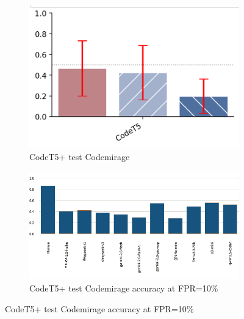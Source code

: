 \begin{figure}[H]
    \begin{subfigure}[b]{0.4\textwidth}
        \centering
        \includegraphics[width=\linewidth]{img/TEST/ohoh/CodeT5+/Codemirage.png}
        \caption{CodeT5+ test Codemirage}
        \label{fig:2}
    \end{subfigure}
    \hfill
    \begin{subfigure}[t]{0.4\textwidth}
        \centering
        \includegraphics[width=\linewidth]{img/TEST/ohoh/Codemirage2.png}
        \caption{CodeT5+ test Codemirage accuracy at FPR=10\%}
        \label{fig:b2}
    \end{subfigure}
\end{figure}
